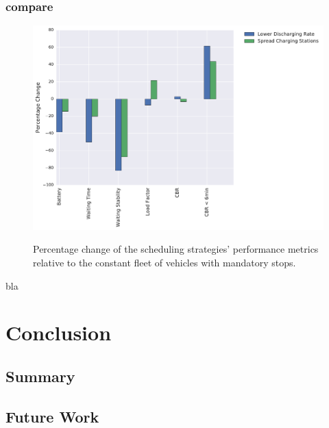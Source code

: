 \documentclass[12pt,a4paper]{article}
\begin{document}
\subsubsection{compare}
\begin{figure}[h] 
  \centering
  \caption{Percentage change of the scheduling strategies' performance metrics relative to the constant fleet of vehicles with mandatory stops.}
\includegraphics[scale=0.6]{./images/batteryCompare.pdf}
\label{batterycompare}
\end{figure}
\begin{table}
\center
\caption{bla}
\end{table}
\section{Conclusion}\label{conclusion}
\subsection{Summary}\label{summary}
\subsection{Future Work}\label{futurework}



\end{document}

